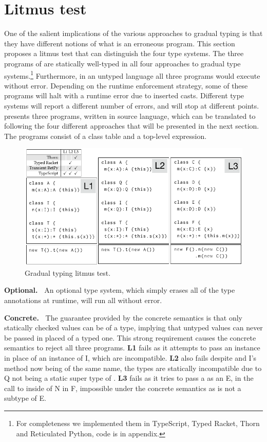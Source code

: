 \documentclass[a4paper,USenglish]{tex/lipics-v2016}
\begin{document}
\section{Litmus test}\label{litmustest}


One of the salient implications of the various approaches to gradual typing
is that they have different notions of what is an erroneous program.  This
section proposes a litmus test that can distinguish the four type
systems. The three programs of  are statically well-typed in
all four approaches to gradual type systems.\footnote{ For completeness we
  implemented them in TypeScript, Typed Racket, Thorn and Reticulated
  Python, code is in appendix.} Furthermore, in an untyped language all
three programs would execute without error. Depending on the runtime
enforcement strategy, some of these programs will halt with a runtime error
due to inserted casts. Different type systems will report a different number
of errors, and will stop at different points.   presents
three programs, written in source language, which can be translated to
\kafka following the four different approaches that will be presented in the
next section. The programs consist of a class table and a top-level
expression.

\begin{figure}[!h]
	\includegraphics[width=.95\columnwidth]{../figures/litm}
	\caption{Gradual typing litmus test.}\label{litmus}
\end{figure}

{\bf Optional.~} An optional type system, which simply erases all of the
type annotations at runtime, will run all without error.

{\bf Concrete.~} The guarantee provided by the concrete semantics is that
only statically checked values can be of a type, implying that untyped
values can never be passed in placed of a typed one. This strong requirement
causes the concrete semantics to reject all three programs. {\bf L1} fails
as it attempts to pass an \A instance in place of an instance of \xt I,
which are incompatible.  {\bf L2} also fails despite \A and \xt I's
method now being of the same name, the types are statically incompatible due
to \xt Q not being a static super type of \A. {\bf L3} fails as it tries to
pass a \C as an \xt E, in the call to \m inside of \xt N in \xt F,
impossible under the concrete semantics as \C is not a subtype of \xt E.
\end{document}
